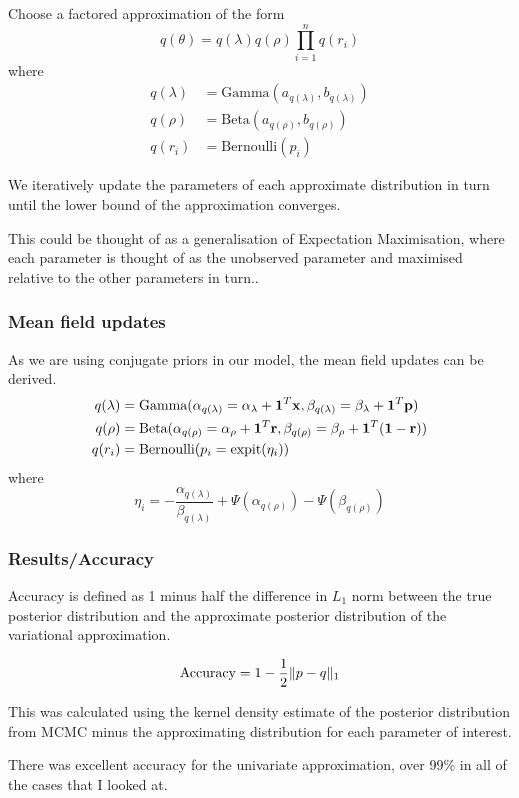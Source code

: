 \documentclass{beamer}
\begin{document}
\begin{frame}
Choose a factored approximation of the form
$$
q(\theta) = q(\lambda) q(\rho) \prod_{i=1}^n q(r_i)
$$
where
\begin{align*}
q(\lambda) &= \text{Gamma}(a_{q(\lambda)}, b_{q(\lambda)}) \\
q(\rho) &= \text{Beta}(a_{q(\rho)}, b_{q(\rho)}) \\
q(r_i) &= \text{Bernoulli}(p_i)
\end{align*}


We iteratively update the parameters of each approximate distribution
in turn until the lower bound of the approximation converges.

This could be thought of as a generalisation of Expectation Maximisation,
where each parameter is thought of as the unobserved parameter and maximised
relative to the other parameters in turn..
\end{frame}
 

\begin{frame}
\frametitle{Mean field updates}
As we are using conjugate priors in our model, the mean field updates can be derived.
\begin{align*}
q(\lambda) &= \text{Gamma}(\alpha_{q(\lambda)} = \alpha_\lambda + {\bf 1}^T {\bf x}, \beta_{q(\lambda)} = \beta_\lambda + {\bf 1}^T{\bf p}) \\
q(\rho) &= \text{Beta}(\alpha_{q(\rho)} = \alpha_\rho + {\bf 1}^T{\bf r}, \beta_{q(\rho)} = \beta_\rho + {\bf 1}^T({\bf 1} - {\bf r})) \\
q(r_i) &= \text{Bernoulli}(p_i = \text{expit}(\eta_i))
\end{align*}
where
$$
\eta_i = - \frac{\alpha_{q(\lambda)}}{\beta_{q(\lambda)}} + \Psi(\alpha_{q(\rho)}) - \Psi(\beta_{q(\rho)})
$$

\end{frame}

\begin{frame}
\frametitle{Results/Accuracy}
Accuracy is defined as 1 minus half the difference in $L_1$ norm between the
true posterior distribution and the approximate posterior distribution of the
variational approximation.

$$
\text{Accuracy} = 1 - {\frac{1}{2}} \|p - q\|_1
$$

This was calculated using the kernel density estimate of the posterior
distribution from MCMC minus the approximating distribution for each parameter of
interest.

There was excellent accuracy for the univariate approximation, over 99\% in all of the cases that I looked at.
\end{frame}
\end{document}
